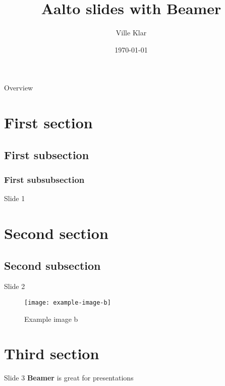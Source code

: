 \documentclass{beamer}
\title{Aalto slides with Beamer}
\author{Ville Klar}
\date{\today}
\begin{document}
\frame{\titlepage}

\begin{frame}{Overview}
    \tableofcontents
\end{frame}

\section{First section}
\subsection{First subsection}
\subsubsection{First subsubsection}
\begin{frame}{Slide 1}   
    \blindtext
\end{frame}              

\section{Second section}
\subsection{Second subsection}
\begin{frame}{Slide 2}   
    \begin{figure}
    \texttt{[image: example-image-b]}
    \caption{Example image b}
    \end{figure}
 \end{frame}              

\section{Third section}
\begin{frame}{Slide 3}   
    \huge{\textbf{Beamer} is great for presentations}
\end{frame}              
\end{document}
